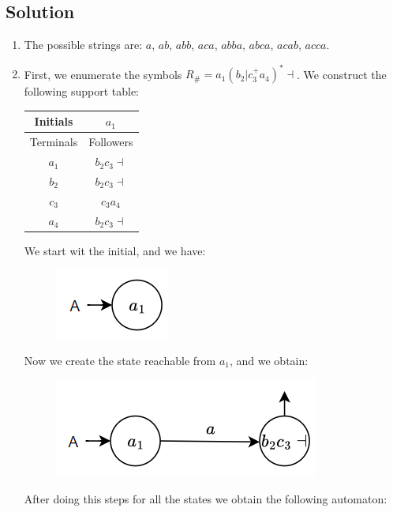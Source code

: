 \documentclass[12pt, a4paper]{report}
\newtheorem[style=M,bodystyle=\normalfont]{theorem}{Theorem}
\newtheorem[style=M,bodystyle=\normalfont]{corollary}{Corollary}
\newtheorem[style=M,bodystyle=\normalfont]{lemma}{Lemma}
\newtheorem[style=M,bodystyle=\normalfont]{definition}{Definition}
\begin{document}
    \subsection*{Solution}
    \begin{enumerate}
        \item The possible strings are: $a$, $ab$, $abb$, $aca$, $abba$, $abca$, $acab$, $acca$. 
        \item First, we enumerate the symbols $R_{\#}=a_1\left( b_2|c^{+}_{3}a_4 \right)^{*}\dashv$. We construct the following support table: 
            \begin{table}[H]
                \centering
                \begin{tabular}{cc}
                Initials                       & $a_1$             \\ \hline
                \multicolumn{1}{c|}{Terminals} & Followers         \\
                \multicolumn{1}{c|}{$a_1$}     & $b_2c_3\dashv$ \\
                \multicolumn{1}{c|}{$b_2$}     & $b_2c_3\dashv$  \\
                \multicolumn{1}{c|}{$c_3$}     & $c_3a_4$         \\
                \multicolumn{1}{c|}{$a_4$}     & $b_2c_3\dashv$ 
                \end{tabular}
            \end{table}
            We start wit the initial, and we have: 
            \begin{figure}[H]
                \centering
                \includegraphics[width=0.2\linewidth]{images/FSA1.png}
            \end{figure}
            Now we create the state reachable from $a_1$, and we obtain: 
            \begin{figure}[H]
                \centering
                \includegraphics[width=0.4\linewidth]{images/FSA2.png}
            \end{figure}
            After doing this steps for all the states we obtain the following automaton: 

\end{enumerate}
\end{document}
